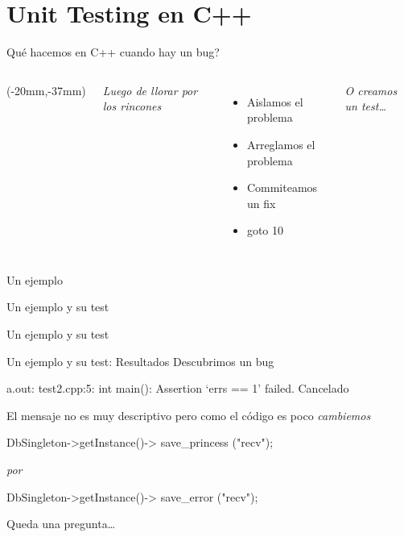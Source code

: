 \section{Unit Testing en C++}


\begin{frame}{\textquestiondown Qu\'e hacemos en C++ cuando hay un bug?}
\begin{columns}[onlytextwidth]
\begin{textblock*}{30mm}(-20mm,-37mm)
\end{textblock*}
	\textit{Luego de llorar por los rincones}
	\begin{itemize}
		\item Aislamos el problema
		\item Arreglamos el problema
		\item Commiteamos un fix
		\item goto 10
	\end{itemize}
	\bigskip
	\textit{O creamos un test\ldots}
\end{columns}
\end{frame}


\begin{frame}[shrink=2,plain,label=OriginalExample]{Un ejemplo}

\end{frame}


\begin{frame}[shrink=2]{Un ejemplo y su test}

\end{frame}


\begin{frame}[shrink=2]{Un ejemplo y su test}

\end{frame}


\begin{frame}[shrink=2,t,fragile]{Un ejemplo y su test: Resultados}
Descubrimos un bug
\begin{semiverbatim}
a.out: test2.cpp:5: int main():
      Assertion `errs == 1' failed.
Cancelado
\end{semiverbatim}
El mensaje no es muy descriptivo pero como el c\'odigo es poco
\textit{ cambiemos }
\begin{center} DbSingleton->getInstance()->\alert{ save\_princess }("recv"); \end{center} 
\textit{ por }
\begin{center} DbSingleton->getInstance()->\alert{ save\_error }("recv"); \end{center}
Queda una pregunta\ldots
\end{frame}


